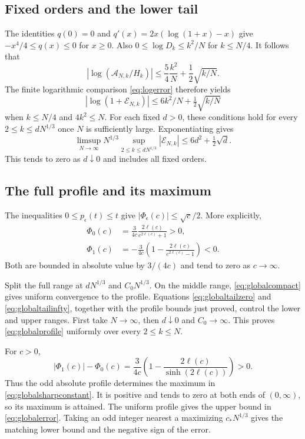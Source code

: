 \documentclass[11pt]{article}
\theoremstyle{definition}
\theoremstyle{remark}
\newcommand{\1}{\mathbf 1}
\begin{document}
\subsection{Fixed orders and the lower tail}

The identities $q(0)=0$ and $q'(x)=2x(\log(1+x)-x)$ give
$-x^4/4\le q(x)\le0$ for $x\ge0$. Also
$0\le\log D_k\le k^2/N$ for $k\le N/4$. It follows that
\[
\left|\log(\mathcal A_{N,k}/H_k)\right|
\le\frac54\frac{k^2}N+\frac12\sqrt{k/N}.
\]
The finite logarithmic comparison \eqref{eq:logerror} therefore yields
\[
\left|\log(1+\mathcal E_{N,k})\right|
\le6k^2/N+\tfrac12\sqrt{k/N}
\]
when $k\le N/4$ and $4k^2\le N$. For each fixed $d>0$, these conditions hold for every $2\le k\le dN^{1/3}$ once $N$ is sufficiently large. Exponentiating gives
\begin{equation}\label{eq:globaltailzero}
\limsup_{N\to\infty}N^{1/3}
\sup_{2\le k\le dN^{1/3}}|\mathcal E_{N,k}|
\le6d^2+\tfrac12\sqrt d.
\end{equation}
This tends to zero as $d\downarrow0$ and includes all fixed orders.

\subsection{The full profile and its maximum}

The inequalities $0\le p_\epsilon(t)\le t$ give
$|\Phi_\epsilon(c)|\le\sqrt c/2$. More explicitly,
\begin{align*}
\Phi_0(c)&=\frac3{4c}\frac{2\ell(c)}{e^{2\ell(c)}+1}>0,\\
\Phi_1(c)&=-\frac3{4c}
\left(1-\frac{2\ell(c)}{e^{2\ell(c)}-1}\right)<0.
\end{align*}
Both are bounded in absolute value by $3/(4c)$ and tend to zero as $c\to\infty$.

Split the full range at $dN^{1/3}$ and $C_0N^{1/3}$. On the middle range, \eqref{eq:globalcompact} gives uniform convergence to the profile. Equations \eqref{eq:globaltailzero} and \eqref{eq:globaltailinfty}, together with the profile bounds just proved, control the lower and upper ranges. First take $N\to\infty$, then $d\downarrow0$ and $C_0\to\infty$. This proves \eqref{eq:globalprofile} uniformly over every $2\le k\le N$.

For $c>0$,
\[
|\Phi_1(c)|-\Phi_0(c)
=\frac3{4c}\left(1-\frac{2\ell(c)}{\sinh(2\ell(c))}\right)>0.
\]
Thus the odd absolute profile determines the maximum in \eqref{eq:globalsharpconstant}. It is positive and tends to zero at both ends of $(0,\infty)$, so its maximum is attained. The uniform profile gives the upper bound in \eqref{eq:globalerror}. Taking an odd integer nearest a maximizing $c_*N^{1/3}$ gives the matching lower bound and the negative sign of the error.
\end{document}
